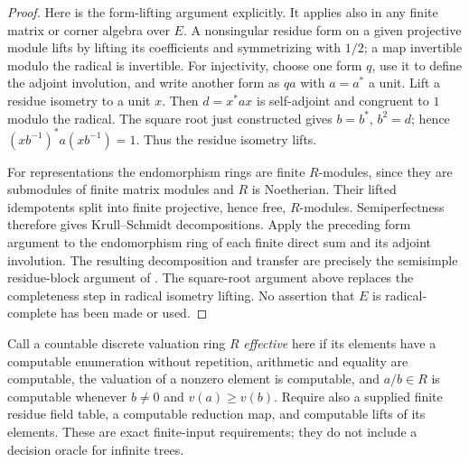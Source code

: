 \begin{proof}
Here is the form-lifting argument explicitly.  It applies
also in any finite matrix or corner algebra over $E$.
A nonsingular residue form on a given projective module
lifts by lifting its coefficients and symmetrizing with
$1/2$; a map invertible modulo the radical is invertible.
For injectivity, choose one form $q$, use it to define the
adjoint involution, and write another form as $q a$ with
$a=a^*$ a unit.  Lift a residue isometry to a unit $x$.
Then $d=x^*ax$ is self-adjoint and congruent to $1$
modulo the radical.  The square root just constructed
gives $b=b^*$, $b^2=d$; hence
$(xb^{-1})^*a(xb^{-1})=1$.
Thus the residue isometry lifts.

For representations the endomorphism rings are finite
$R$-modules, since they are submodules of finite matrix
modules and $R$ is Noetherian.  Their lifted idempotents
split into finite projective, hence free, $R$-modules.
Semiperfectness therefore gives Krull--Schmidt decompositions.
Apply the preceding form argument to the endomorphism ring
of each finite direct sum and its adjoint involution.
The resulting decomposition and transfer are precisely
the semisimple residue-block argument of
\cite[Theorem 2.2, Corollary 2.3, Propositions 2.4--2.5,
and Section 3, pp.\ 269--273]{C-QSS1979}.
The square-root argument above replaces the completeness
step in radical isometry lifting.  No assertion that $E$
is radical-complete has been made or used.
\end{proof}

Call a countable discrete valuation ring $R$ \emph{effective}
here if its elements have a computable enumeration without
repetition, arithmetic and equality are computable, the
valuation of a nonzero element is computable, and $a/b\in R$
is computable whenever $b\ne0$ and $v(a)\geq v(b)$.
Require also a supplied finite residue field table, a
computable reduction map, and computable lifts of its
elements.  These are exact finite-input requirements;
they do not include a decision oracle for infinite trees.

